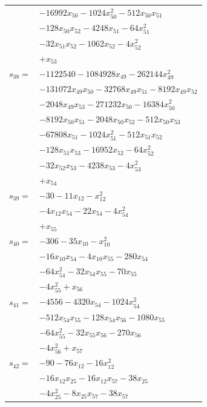 \begin{longtable}{@{}r@{\;}l@{}}
 & \(\displaystyle -16992x_{50} -1024x_{50}^{2} -512x_{50}x_{51}\) \\
 & \(\displaystyle -128x_{50}x_{52} -4248x_{51} -64x_{51}^{2}\) \\
 & \(\displaystyle -32x_{51}x_{52} -1062x_{52} -4x_{52}^{2}\) \\
 & \(\displaystyle +x_{53}\) \\[3pt]
\(s_{38}=\) & \(\displaystyle -1122540 -1084928x_{49} -262144x_{49}^{2}\) \\
 & \(\displaystyle -131072x_{49}x_{50} -32768x_{49}x_{51} -8192x_{49}x_{52}\) \\
 & \(\displaystyle -2048x_{49}x_{53} -271232x_{50} -16384x_{50}^{2}\) \\
 & \(\displaystyle -8192x_{50}x_{51} -2048x_{50}x_{52} -512x_{50}x_{53}\) \\
 & \(\displaystyle -67808x_{51} -1024x_{51}^{2} -512x_{51}x_{52}\) \\
 & \(\displaystyle -128x_{51}x_{53} -16952x_{52} -64x_{52}^{2}\) \\
 & \(\displaystyle -32x_{52}x_{53} -4238x_{53} -4x_{53}^{2}\) \\
 & \(\displaystyle +x_{54}\) \\[3pt]
\(s_{39}=\) & \(\displaystyle -30 -11x_{12} -x_{12}^{2}\) \\
 & \(\displaystyle -4x_{12}x_{54} -22x_{54} -4x_{54}^{2}\) \\
 & \(\displaystyle +x_{55}\) \\[3pt]
\(s_{40}=\) & \(\displaystyle -306 -35x_{10} -x_{10}^{2}\) \\
 & \(\displaystyle -16x_{10}x_{54} -4x_{10}x_{55} -280x_{54}\) \\
 & \(\displaystyle -64x_{54}^{2} -32x_{54}x_{55} -70x_{55}\) \\
 & \(\displaystyle -4x_{55}^{2} +x_{56}\) \\[3pt]
\(s_{41}=\) & \(\displaystyle -4556 -4320x_{54} -1024x_{54}^{2}\) \\
 & \(\displaystyle -512x_{54}x_{55} -128x_{54}x_{56} -1080x_{55}\) \\
 & \(\displaystyle -64x_{55}^{2} -32x_{55}x_{56} -270x_{56}\) \\
 & \(\displaystyle -4x_{56}^{2} +x_{57}\) \\[3pt]
\(s_{42}=\) & \(\displaystyle -90 -76x_{12} -16x_{12}^{2}\) \\
 & \(\displaystyle -16x_{12}x_{25} -16x_{12}x_{57} -38x_{25}\) \\
 & \(\displaystyle -4x_{25}^{2} -8x_{25}x_{57} -38x_{57}\) \\

\end{longtable}
